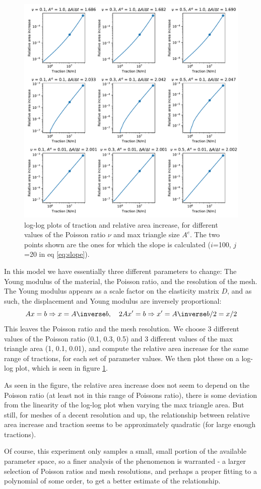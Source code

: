 \documentclass[sigconf]{acmart}
\begin{document}
\begin{figure}
	\centering
	\includegraphics[width=\linewidth]{squares.pdf}
	\caption{log-log plots of traction and relative area increase, for different values of the Poisson ratio $ \nu $ and max triangle size $ A^e $. The two points shown are the ones for which the slope is calculated ($ i $=100, $ j $=20 in eq \ref{eq:slope}).}
	\label{fig:squares}
\end{figure}
In this model we have essentially three different parameters to change: The Young modulus of the material, the Poisson ratio, and the resolution of the mesh. The Young modulus appears as a scale factor on the elasticity matrix $ D $, and as such, the displacement and Young modulus are inversely proportional:
\begin{equation*}\label{key}
	Ax=b \Rightarrow x = A\inverse b, \quad 2Ax' = b \Rightarrow x'=A\inverse b/2 = x/2
\end{equation*}
This leaves the Poisson ratio and the mesh resolution. We choose 3 different values of the Poisson ratio (0.1, 0.3, 0.5) and 3 different values of the max triangle area (1, 0.1, 0.01), and compute the relative area increase for the same range of tractions, for each set of parameter values. We then plot these on a log-log plot, which is seen in figure \ref{fig:squares}.

As seen in the figure, the relative area increase does not seem to depend on the Poisson ratio (at least not in this range of Poissons ratio), there is some deviation from the linearity of the log-log plot when varying the max triangle area. But still, for meshes of a decent resolution and up, the relationship between relative area increase and traction seems to be approximately quadratic (for large enough tractions).

Of course, this experiment only samples a small, small portion of the available parameter space, so a finer analysis of the phenomenon is warranted - a larger selection of Poisson ratios and mesh resolutions, and perhaps a proper fitting to a polynomial of some order, to get a better estimate of the relationship.
\end{document}
